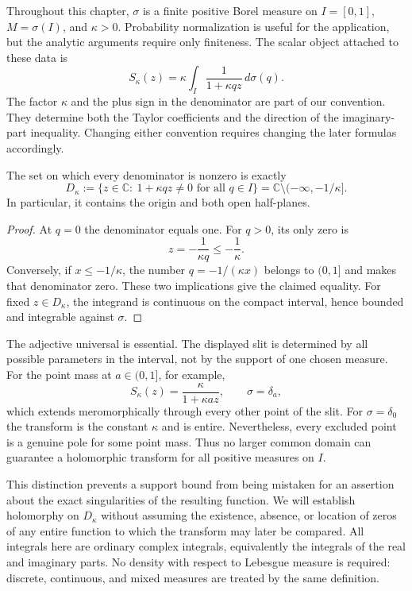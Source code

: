 \label{res:domain}
Throughout this chapter, $\sigma$ is a finite positive Borel measure on
$I=[0,1]$, $M=\sigma(I)$, and $\kappa>0$. Probability normalization is useful
for the application, but the analytic arguments require only finiteness.
The scalar object attached to these data is
\[
 S_\kappa(z)=\kappa\int_I\frac{1}{1+\kappa qz}\,d\sigma(q).
\]
The factor $\kappa$ and the plus sign in the denominator are part of our
convention. They determine both the Taylor coefficients and the direction
of the imaginary-part inequality. Changing either convention requires
changing the later formulas accordingly.

\begin{proposition}
The set on which every denominator is nonzero is exactly
\[
 D_\kappa:=\{z\in\mathbb C:\ 1+\kappa qz\ne0\text{ for all }q\in I\}
       =\mathbb C\setminus(-\infty,-1/\kappa].
\]
In particular, it contains the origin and both open half-planes.
\end{proposition}
\begin{proof}
At $q=0$ the denominator equals one. For $q>0$, its only zero is
\[
 z=-\frac{1}{\kappa q}\le-\frac1\kappa.
\]
Conversely, if $x\le-1/\kappa$, the number $q=-1/(\kappa x)$ belongs to
$(0,1]$ and makes that denominator zero. These two implications give the
claimed equality. For fixed $z\in D_\kappa$, the integrand is continuous
on the compact interval, hence bounded and integrable against $\sigma$.
\end{proof}

The adjective universal is essential. The displayed slit is determined by
all possible parameters in the interval, not by the support of one chosen
measure. For the point mass at $a\in(0,1]$, for example,
\[
 S_\kappa(z)=\frac{\kappa}{1+\kappa az},
 \qquad \sigma=\delta_a,
\]
which extends meromorphically through every other point of the slit.
For $\sigma=\delta_0$ the transform is the constant $\kappa$ and is entire.
Nevertheless, every excluded point is a genuine pole for some point mass.
Thus no larger common domain can guarantee a holomorphic transform for
all positive measures on $I$.

This distinction prevents a support bound from being mistaken for an
assertion about the exact singularities of the resulting function. We
will establish holomorphy on $D_\kappa$ without assuming the existence,
absence, or location of zeros of any entire function to which the
transform may later be compared.
All integrals here are ordinary complex integrals, equivalently the
integrals of the real and imaginary parts. No density with respect to
Lebesgue measure is required: discrete, continuous, and mixed measures
are treated by the same definition.

